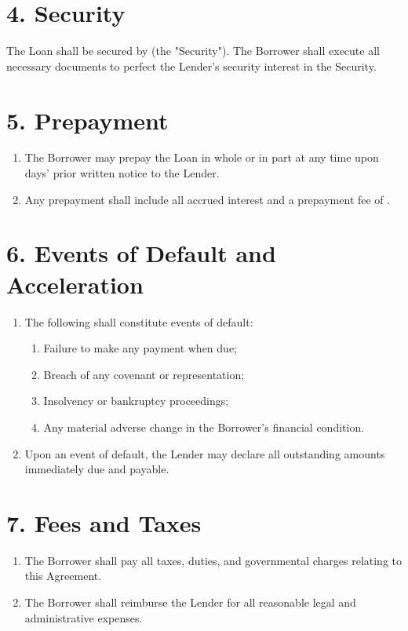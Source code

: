 \documentclass[12pt]{ctexart}
\begin{document}
\section*{4. Security}
The Loan shall be secured by \underline{\hspace{6cm}} (the "Security"). The Borrower shall execute all necessary documents to perfect the Lender's security interest in the Security.

\section*{5. Prepayment}
\begin{enumerate}[label=5.\arabic*]
    \item The Borrower may prepay the Loan in whole or in part at any time upon \underline{\hspace{2cm}} days' prior written notice to the Lender.
    \item Any prepayment shall include all accrued interest and a prepayment fee of \underline{\hspace{3cm}}.
\end{enumerate}

\section*{6. Events of Default and Acceleration}
\begin{enumerate}[label=6.\arabic*]
    \item The following shall constitute events of default:
    \begin{enumerate}[label=(\alph*)]
        \item Failure to make any payment when due;
        \item Breach of any covenant or representation;
        \item Insolvency or bankruptcy proceedings;
        \item Any material adverse change in the Borrower's financial condition.
    \end{enumerate}
    \item Upon an event of default, the Lender may declare all outstanding amounts immediately due and payable.
\end{enumerate}

\section*{7. Fees and Taxes}
\begin{enumerate}[label=7.\arabic*]
    \item The Borrower shall pay all taxes, duties, and governmental charges relating to this Agreement.
    \item The Borrower shall reimburse the Lender for all reasonable legal and administrative expenses.
\end{enumerate}
\end{document}
